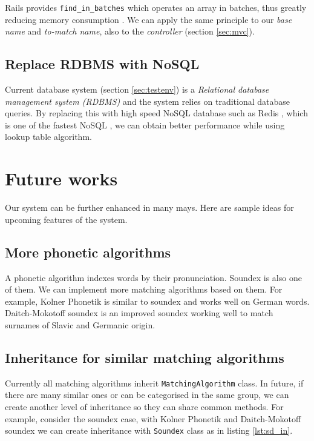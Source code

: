 Rails provides \texttt{find\_in\_batches} which operates an array in batches,
thus greatly reducing memory consumption \cite[]{fib}. We can apply
the same principle to our \emph{base name} and \emph{to-match name},
also to the \emph{controller} (section \ref{sec:mvc}).

\subsection{Replace RDBMS with NoSQL}

Current database system (section \ref{sec:testenv}) is a
\emph{Relational database management system (RDBMS)} \cite[]{rdbms} and the system
relies on traditional database queries. By replacing this with high speed
NoSQL database such as Redis \cite[]{redis}, which is one of the fastest
NoSQL \cite[]{redis2}, we can obtain better performance while using
lookup table algorithm.

\section{Future works}

Our system can be further enhanced in many mays. Here are sample ideas
for upcoming features of the system.

\subsection{More phonetic algorithms}

A phonetic algorithm \cite[]{phonea} indexes words by their pronunciation.
Soundex is also one of them. We can implement more matching algorithms
based on them. For example, Kolner Phonetik \cite[]{kolner} is similar to
soundex and works well on German words. Daitch-Mokotoff soundex \cite[]{dms}
is an improved soundex working well to match surnames of Slavic and Germanic origin.

\subsection{Inheritance for similar matching algorithms}

Currently all matching algorithms inherit \texttt{MatchingAlgorithm} class.
In future, if there are many similar ones or can be categorised in the
same group, we can create another level of inheritance so they can share
common methods. For example, consider the soundex case, with Kolner Phonetik
and Daitch-Mokotoff soundex we can create inheritance with \texttt{Soundex} class
as in listing \ref{lst:sd_in}.

